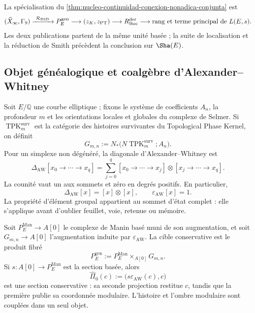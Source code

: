 \noindent La spécialisation du
\cref{thm:nucleo-continuidad-conexion-nonadica-conjunta} est
\[
 (\widehat X_\infty,\Gamma_9)
 \xrightarrow{\ \mathcal R_{\rm BSD}\ }
 P_E^{\rm gen}
 \longrightarrow(z_K,z_{\rm PT})
 \longrightarrow R_{\rm Boc}^{\rm der}
 \longrightarrow\text{rang et terme principal de }L(E,s).
\]
Les deux publications partent de la même unité basée ; la suite de
localisation et la réduction de Smith précèdent la conclusion sur
\(\Sha(E)\).

\subsection*{Objet généalogique et coalgèbre d'Alexander--Whitney}

Soit \(E/\mathbb Q\) une courbe elliptique ; fixons le système de coefficients
\(A_n\), la profondeur \(m\) et les orientations locales et globales du
complexe de Selmer. Si
\(\operatorname{TPK}^{\mathrm{surv}}_{m}\) est la catégorie des histoires
survivantes du Topological Phase Kernel, on définit
\begin{equation}\label{eq:bsd-suc-gmn}
 G_{m,n}:=
 N_{*}\bigl(N\operatorname{TPK}^{\mathrm{surv}}_{m};A_n\bigr).
\end{equation}
Pour un simplexe non dégénéré, la diagonale d'Alexander--Whitney est
\begin{equation}\label{eq:bsd-suc-aw}
 \Delta_{\mathrm{AW}}[x_0\to\cdots\to x_q]
 =\sum_{j=0}^{q}
 [x_0\to\cdots\to x_j]\otimes
 [x_j\to\cdots\to x_q].
\end{equation}
La counité vaut un aux sommets et zéro en degrés positifs. En
particulier,
\begin{equation}\label{eq:bsd-suc-group-like}
 \Delta_{\mathrm{AW}}[x]=[x]\otimes[x],
 \qquad \varepsilon_{\mathrm{AW}}[x]=1.
\end{equation}
La propriété d'élément groupal appartient au sommet d'état complet : elle s'applique
avant d'oublier feuillet, voie, retenue ou mémoire.

Soit \(P_E^{\mathrm{Man}}\to A[0]\) le complexe de Manin basé muni de son
augmentation, et soit \(G_{m,n}\to A[0]\) l'augmentation induite par
\(\varepsilon_{\mathrm{AW}}\). La cible conservative est le produit
fibré
\begin{equation}\label{eq:bsd-suc-pullback}
 P_E^{\mathrm{gen}}
 :=P_E^{\mathrm{Man}}\times_{A[0]}G_{m,n}.
\end{equation}
Si \(s:A[0]\to P_E^{\mathrm{Man}}\) est la section basée, alors
\begin{equation}\label{eq:bsd-suc-section}
 \widehat\Pi_0(c)
 :=\bigl(s\varepsilon_{\mathrm{AW}}(c),c\bigr)
\end{equation}
est une section conservative : sa seconde projection restitue \(c\), tandis que
la première publie sa coordonnée modulaire. L'histoire et l'ombre modulaire
sont couplées dans un seul objet.

